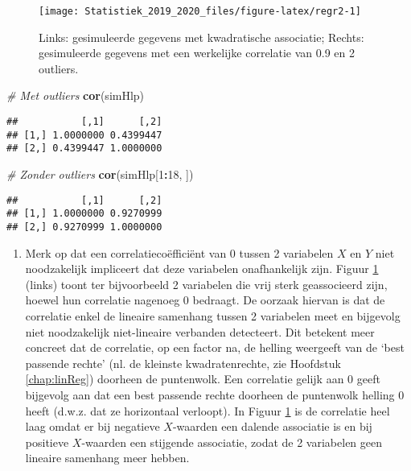 \documentclass[12pt,dutch,coursenotes]{book}
\newenvironment{Shaded}{\begin{snugshade}}{\end{snugshade}}
\newcommand{\KeywordTok}[1]{\textcolor[rgb]{0.13,0.29,0.53}{\textbf{#1}}}
\newcommand{\DecValTok}[1]{\textcolor[rgb]{0.00,0.00,0.81}{#1}}
\newcommand{\CommentTok}[1]{\textcolor[rgb]{0.56,0.35,0.01}{\textit{#1}}}
\newcommand{\OperatorTok}[1]{\textcolor[rgb]{0.81,0.36,0.00}{\textbf{#1}}}
\newcommand{\NormalTok}[1]{#1}
\providecommand{\tightlist}{%
  \setlength{\itemsep}{0pt}\setlength{\parskip}{0pt}}
\theoremstyle{definition}
\theoremstyle{definition}
\theoremstyle{definition}
\theoremstyle{remark}
\begin{document}
\begin{figure}

{\centering \texttt{[image: Statistiek\_2019\_2020\_files/figure-latex/regr2-1]} 

}

\caption{Links: gesimuleerde gegevens met kwadratische associatie; Rechts: gesimuleerde gegevens met een werkelijke correlatie van 0.9 en 2 outliers.}\label{fig:regr2}
\end{figure}

\begin{Shaded}
\begin{Highlighting}[]
\CommentTok{# Met outliers}
\KeywordTok{cor}\NormalTok{(simHlp)}
\end{Highlighting}
\end{Shaded}

\begin{verbatim}
##           [,1]      [,2]
## [1,] 1.0000000 0.4399447
## [2,] 0.4399447 1.0000000
\end{verbatim}

\begin{Shaded}
\begin{Highlighting}[]
\CommentTok{# Zonder outliers}
\KeywordTok{cor}\NormalTok{(simHlp[}\DecValTok{1}\OperatorTok{:}\DecValTok{18}\NormalTok{, ])}
\end{Highlighting}
\end{Shaded}

\begin{verbatim}
##           [,1]      [,2]
## [1,] 1.0000000 0.9270999
## [2,] 0.9270999 1.0000000
\end{verbatim}

\begin{enumerate}
\def\labelenumi{\arabic{enumi}.}
\setcounter{enumi}{1}
\tightlist
\item
  Merk op dat een correlatiecoëfficiënt van 0 tussen 2 variabelen \(X\)
  en \(Y\) niet noodzakelijk impliceert dat deze variabelen
  onafhankelijk zijn. Figuur \ref{fig:regr2} (links) toont ter
  bijvoorbeeld 2 variabelen die vrij sterk geassocieerd zijn, hoewel hun
  correlatie nagenoeg 0 bedraagt. De oorzaak hiervan is dat de
  correlatie enkel de lineaire samenhang tussen 2 variabelen meet en
  bijgevolg niet noodzakelijk niet-lineaire verbanden detecteert. Dit
  betekent meer concreet dat de correlatie, op een factor na, de helling
  weergeeft van de `best passende rechte' (nl. de kleinste
  kwadratenrechte, zie Hoofdstuk \ref{chap:linReg}) doorheen de
  puntenwolk. Een correlatie gelijk aan 0 geeft bijgevolg aan dat een
  best passende rechte doorheen de puntenwolk helling 0 heeft (d.w.z.
  dat ze horizontaal verloopt). In Figuur \ref{fig:regr2} is de
  correlatie heel laag omdat er bij negatieve \(X\)-waarden een dalende
  associatie is en bij positieve \(X\)-waarden een stijgende associatie,
  zodat de 2 variabelen geen lineaire samenhang meer hebben.
\end{enumerate}
\end{document}
